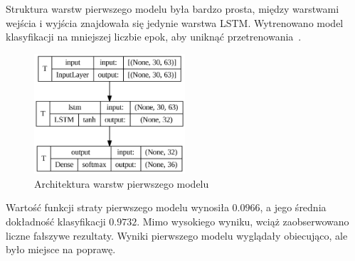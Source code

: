 Struktura warstw pierwszego modelu była bardzo prosta, między warstwami wejścia i wyjścia znajdowała się jedynie warstwa LSTM. Wytrenowano model klasyfikacji na mniejszej liczbie epok, aby uniknąć przetrenowania~\cite{dietterich1995}.

\begin{figure}[H]
    \centering
    \includegraphics[width=0.5\textwidth]{figures/initial-layers}
    \caption{Architektura warstw pierwszego modelu}
    \label{fig:initial-layers}
\end{figure}

Wartość funkcji straty pierwszego modelu wynosiła $0.0966$, a jego średnia dokładność klasyfikacji $0.9732$. Mimo wysokiego wyniku, wciąż zaobserwowano liczne fałszywe rezultaty. Wyniki pierwszego modelu wyglądały obiecująco, ale było miejsce na poprawę.

